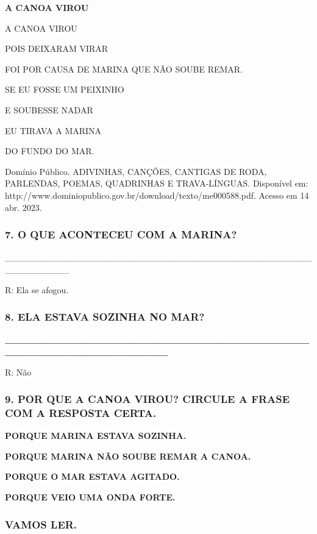 \textbf{A CANOA VIROU}

A CANOA VIROU

POIS DEIXARAM VIRAR

FOI POR CAUSA DE MARINA QUE NÃO SOUBE REMAR.

SE EU FOSSE UM PEIXINHO

E SOUBESSE NADAR

EU TIRAVA A MARINA

DO FUNDO DO MAR.

Domínio Público. ADIVINHAS, CANÇÕES, CANTIGAS DE RODA, PARLENDAS, POEMAS, QUADRINHAS E TRAVA-LÍNGUAS. Disponível em: http://www.dominiopublico.gov.br/download/texto/me000588.pdf. Acesso em 14 abr. 2023.

\subsubsection{7. O QUE ACONTECEU COM A
MARINA?}\label{o-que-aconteceu-com-a-marina}

\_\_\_\_\_\_\_\_\_\_\_\_\_\_\_\_\_\_\_\_\_\_\_\_\_\_\_\_\_\_\_\_\_\_\_\_\_\_\_\_\_\_\_\_\_\_\_\_\_\_\_\_\_\_\_\_\_\_

R: Ela se afogou.

\subsubsection{8. ELA ESTAVA SOZINHA NO
MAR?}\label{ela-estava-sozinha-no-mar}

\textbf{\_\_\_\_\_\_\_\_\_\_\_\_\_\_\_\_\_\_\_\_\_\_\_\_\_\_\_\_\_\_\_\_\_\_\_\_\_\_\_\_\_\_\_\_\_\_\_\_\_\_\_\_\_\_\_\_\_\_\_\_\_\_\_}

R: Não

\subsubsection{9. POR QUE A CANOA VIROU? CIRCULE A FRASE COM A RESPOSTA
CERTA.}\label{por-que-a-canoa-virou-circule-o-baluxe3o-com-a-resposta-certa.}

\textbf{PORQUE MARINA ESTAVA SOZINHA.}

\textbf{PORQUE MARINA NÃO SOUBE REMAR A CANOA.}

\textbf{PORQUE O MAR ESTAVA AGITADO.}

\textbf{PORQUE VEIO UMA ONDA FORTE.}

\subsubsection{VAMOS LER.}\label{vamos-ler.}

